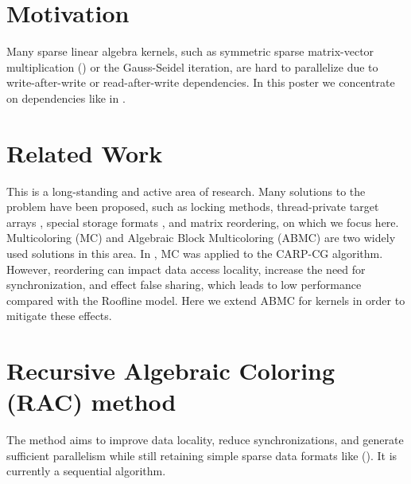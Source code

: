 \section{Motivation}

Many sparse linear algebra kernels, such as symmetric sparse
matrix-vector multiplication (\SymmSpmv) or the Gauss-Seidel iteration, are hard
to parallelize due to write-after-write or read-after-write
dependencies.  In this poster we concentrate on \DTWO dependencies
like in \SymmSpmv. 

\section{Related Work}

This is a long-standing and active area of research. Many solutions to
the \DTWO problem have been proposed, such as locking methods,
thread-private target arrays \cite{thread_private_symm_spmv}, special
storage formats \cite{CSB,RSB}, and matrix reordering, on which we
focus here. Multicoloring (MC) \cite{MC,COLPACK} and Algebraic Block
Multicoloring (ABMC) \cite{ABMC} are two widely used solutions in this
area. In \cite{feast_mc}, MC was applied to the CARP-CG
algorithm. However, reordering can impact data access locality,
increase the need for synchronization, and effect false sharing, which
leads to low performance compared with the Roof\/line model.
Here we extend ABMC for \DTWO kernels in order to mitigate these effects.


\section{Recursive Algebraic Coloring (RAC) method}

The method aims to improve data locality, reduce synchronizations, and
generate sufficient parallelism while still retaining simple sparse
data formats like \CRSfull (\CRS). It is currently a sequential
algorithm.

